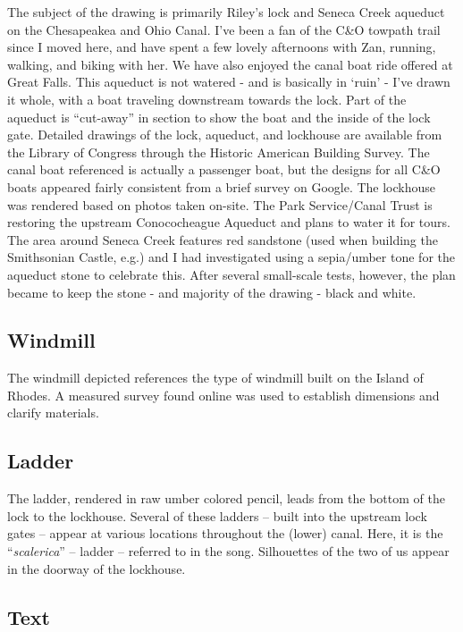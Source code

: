﻿\documentclass[letterpaper, 12pt, landscape]{ProgressBook}
\begin{document}
The subject of the drawing is primarily Riley's lock and Seneca
Creek aqueduct on the Chesapeakea and Ohio Canal. I've been a fan of the
C\&O towpath trail since I moved here, and have spent a few lovely
afternoons with Zan, running, walking, and biking with her. We have also
enjoyed the canal boat ride offered at Great Falls.
This aqueduct is not watered - and is basically in `ruin' - I've
drawn it whole, with a boat traveling downstream towards the lock. Part of the
aqueduct is ``cut-away'' in section to show the boat and the inside of
the lock gate. Detailed drawings of the lock, aqueduct, and lockhouse are
available from the Library of Congress through the Historic American Building
Survey. The canal boat referenced is actually a passenger boat, but the designs
for all C\&O boats appeared fairly consistent from a brief survey on Google.
The lockhouse was rendered based on photos taken on-site.
The Park Service/Canal Trust is restoring the upstream
Conococheague Aqueduct and plans to water it for tours. The area around Seneca
Creek features red sandstone (used when building the Smithsonian Castle, e.g.)
and I had investigated using a sepia/umber tone for the aqueduct stone to
celebrate this. After several small-scale tests, however, the plan became to
keep the stone - and majority of the drawing - black and white.

\subsection*{Windmill}

The windmill depicted references the type of windmill built on the
Island of Rhodes. A measured survey found online was used to establish
dimensions and clarify materials.

\subsection*{Ladder}

The ladder, rendered in raw umber colored pencil, leads from the
bottom of the lock to the lockhouse. Several of these ladders – built into the
upstream lock gates – appear at various locations throughout the (lower) canal.
Here, it is the ``\textit{scalerica}'' -- ladder -- referred to in the song. Silhouettes of the two of
us appear in the doorway of the lockhouse.

\subsection*{Text}
\end{document}
